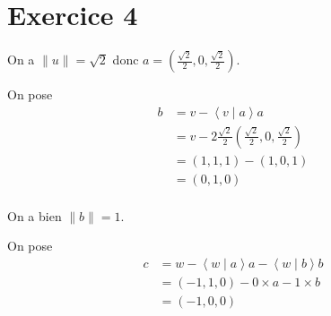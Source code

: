\part{Exercice 4}

On a $\|u\| = \sqrt{2}$ donc $a = \left( \frac{\sqrt{2}}{2},0,\frac{\sqrt{2}}{2} \right)$.

On pose
\begin{align*}
	b &= v - \left<v \mid a \right> a\\
	&= v - 2\frac{\sqrt{2}}{2} \left( \frac{\sqrt{2}}{2}, 0, \frac{\sqrt{2}}{2} \right)  \\
	&= (1,1,1) - (1, 0, 1) \\
	&= (0,1,0) \\
\end{align*}

On a bien $\|b\| = 1$.

On pose
\begin{align*}
	c &= w - \left<w \mid a \right>a - \left<w \mid b \right>b\\
	&= (-1, 1, 0) - 0 \times a - 1\times b \\
	&= (-1, 0, 0) \\
\end{align*}

